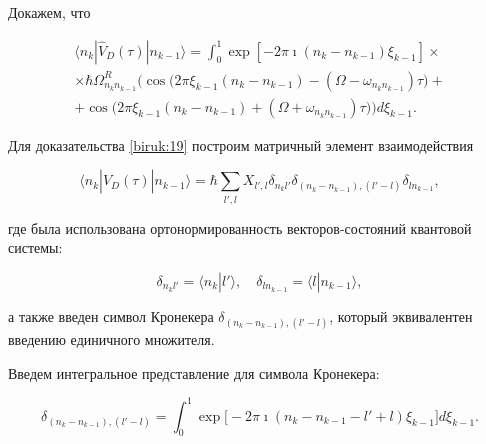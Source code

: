 Докажем, что

\begin{multline}

\langle n_k |\hat{V}_D(\tau)|n_{k-1}\rangle=\int_{0}^{1} \exp[-2\pi \imath (n_k-n_{k-1})\xi_{k-1}] 

\times 

\\ \times

 \hbar \Omega_{n_k n_{k-1}}^R 

 \bigl(\cos\bigl(2\pi \xi_{k-1} (n_{k}-n_{k-1}) - (\Omega-\omega_{n_{k} n_{k-1}})\tau \bigr)

+

\\

+

\cos\bigl(2\pi \xi_{k-1} (n_{k}-n_{k-1}) + (\Omega+\omega_{n_{k} n_{k-1}})\tau \bigr)\bigr) d\xi_{k-1}. \label{biruk:19}

\end{multline}



Для доказательства \eqref{biruk:19} построим матричный элемент взаимодействия 

\begin{equation}

\label{biruk:20}

\langle n_k |\hat{V}_D(\tau)|n_{k-1}\rangle=

\hbar\sum\limits_{l',l} X_{l',l}\delta_{n_k l'} \delta_{(n_k-n_{k-1}),(l'-l)} \delta_{l n_{k-1}}, 

\end{equation}

где была использована ортонормированность векторов-состояний квантовой системы:

$$\delta_{n_k l'}=\langle n_k | l' \rangle, \quad \delta_{l n_{k-1}}=\langle l | n_{k-1} \rangle,$$ 

а также введен символ Кронекера $\delta_{(n_k-n_{k-1}),(l'-l)}$, который эквивалентен введению единичного множителя. 

Введем интегральное представление для символа Кронекера:

\begin{equation}

\label{biruk:21}

\delta_{(n_k-n_{k-1}),(l'-l)} = \int_{0}^{1}\exp\bigl[-2\pi \imath (n_k-n_{k-1}-l'+l)\xi_{k-1}\bigr] d\xi_{k-1}.

\end{equation}







